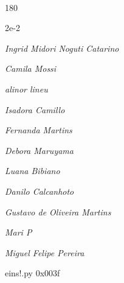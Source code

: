 \documentclass[12pt]{article}
\begin{document}
\pagebreak			

	\ 
	\vfill
	\begin{turn}{180}	
		\begin{minipage}{\textwidth}
		  	\ttfamily %
			\centering
			{\Huge 2e-2}
		  
			\hfill
		  
			

\textit{\small Ingrid Midori Noguti Catarino}

\textit{\small Camila Mossi}

\textit{\small alinor lineu}

\textit{\small Isadora Camillo}

\textit{\small Fernanda Martins}

\textit{\small Debora Maruyama}

\textit{\small Luana Bibiano}

\textit{\small Danilo Calcanhoto}

\textit{\small Gustavo de Oliveira Martins}

\textit{\small Mari P}

\textit{\small Miguel Felipe Pereira}

\bigskip

eins!.py
0x003f


		\end{minipage}	
	\end{turn}
	\vfill
	\

\pagebreak
\end{document}
